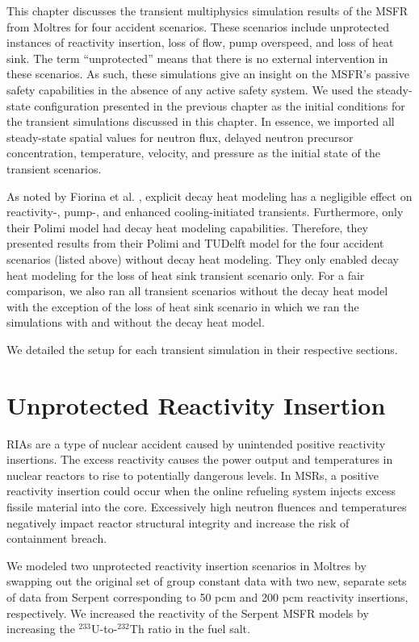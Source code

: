 This chapter discusses the transient multiphysics simulation results of the
\gls{MSFR} from Moltres for four accident scenarios. These scenarios include
unprotected instances of reactivity insertion, loss of flow, pump overspeed,
and loss of heat sink. The term ``unprotected'' means that there is no
external intervention in these scenarios. As such, these simulations
give an insight on the \gls{MSFR}'s passive safety capabilities in the absence
of any active safety system. We used the steady-state configuration presented
in the previous chapter as the initial conditions for the transient
simulations discussed in this chapter. In essence, we imported all
steady-state spatial values for neutron flux, delayed neutron precursor
concentration, temperature, velocity, and pressure as the initial state of the
transient scenarios.

As noted by Fiorina et al. \cite{fiorina_modelling_2014}, explicit decay heat
modeling has a negligible effect on reactivity-, pump-, and enhanced
cooling-initiated transients. Furthermore, only their Polimi model had decay
heat modeling capabilities. Therefore, they presented results from their
Polimi and TUDelft model for the four accident scenarios (listed above)
without decay heat modeling. They only enabled decay heat modeling for the
loss of heat sink transient scenario only. For a fair comparison, we also ran
all transient scenarios without the decay heat model with the exception of the
loss of heat sink scenario in which we ran the simulations with and without
the decay heat model.

We detailed the setup for each transient simulation in their respective
sections.

\section{Unprotected Reactivity Insertion}

\glspl{RIA} are a type of nuclear accident caused by unintended positive
reactivity insertions. The excess reactivity causes the power output and
temperatures in nuclear reactors to rise to potentially dangerous levels. In
\glspl{MSR}, a positive reactivity insertion could occur when the online
refueling system injects excess fissile material into the core. Excessively
high neutron fluences and temperatures negatively impact reactor structural
integrity and increase the risk of containment breach.

We modeled two unprotected reactivity insertion scenarios in Moltres by
swapping out the original set of group constant data with two new, separate
sets of data from Serpent corresponding to 50 pcm and 200 pcm reactivity
insertions, respectively. We increased the reactivity of the Serpent
\gls{MSFR} models by increasing the $^{233}$U-to-$^{232}$Th ratio in the fuel
salt.


